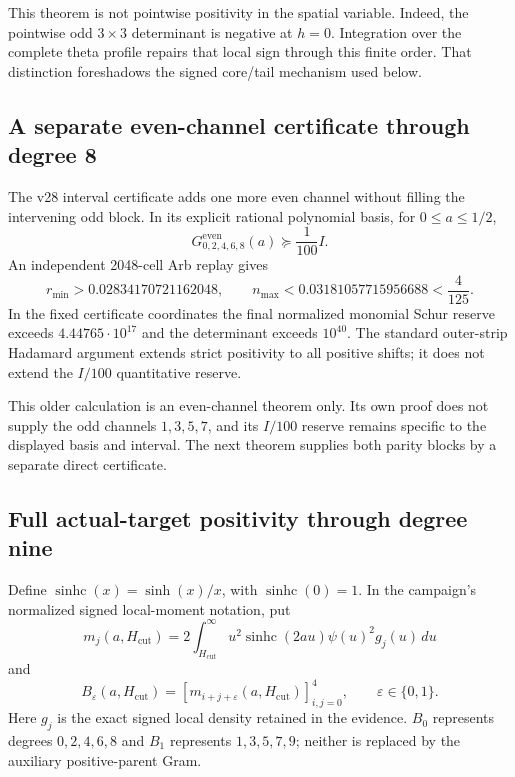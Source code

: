 \documentclass[11pt]{article}
\theoremstyle{definition}
\theoremstyle{remark}
\begin{document}
This theorem is not pointwise positivity in the spatial variable. Indeed, the
pointwise odd $3\times3$ determinant is negative at $h=0$. Integration over the
complete theta profile repairs that local sign through this finite order. That
distinction foreshadows the signed core/tail mechanism used below.

\subsection{A separate even-channel certificate through degree 8}

The v28 interval certificate adds one more even channel without filling the
intervening odd block. In its explicit rational polynomial basis, for
$0\le a\le1/2$,
\begin{equation}
 G^{\mathrm{even}}_{0,2,4,6,8}(a)\succeq\frac1{100}I.
 \label{eq:even8-reserve}
\end{equation}
An independent 2048-cell Arb replay gives
\begin{equation}
 r_{\min}>0.02834170721162048,
 \qquad n_{\max}<0.03181057715956688<\frac4{125}.
\end{equation}
In the fixed certificate coordinates the final normalized monomial Schur
reserve exceeds $4.44765\cdot10^{17}$ and the determinant exceeds $10^{40}$.
The standard outer-strip Hadamard argument
extends strict positivity to all positive shifts; it does not extend the
$I/100$ quantitative reserve.

This older calculation is an even-channel theorem only. Its own proof does not
supply the odd channels $1,3,5,7$, and its $I/100$ reserve remains specific to
the displayed basis and interval. The next theorem supplies both parity blocks
by a separate direct certificate.

\subsection{Full actual-target positivity through degree nine}

Define $\operatorname{sinhc}(x)=\sinh(x)/x$, with
$\operatorname{sinhc}(0)=1$. In the campaign's normalized signed local-moment
notation, put
\begin{equation}
 m_j(a,H_{\mathrm{cut}})
 =2\int_{H_{\mathrm{cut}}}^{\infty}
 u^2\operatorname{sinhc}(2au)\psi(u)^2g_j(u)\,du
 \label{eq:v32-shifted-moments}
\end{equation}
and
\begin{equation}
 B_\varepsilon(a,H_{\mathrm{cut}})
 =[m_{i+j+\varepsilon}(a,H_{\mathrm{cut}})]_{i,j=0}^{4},
 \qquad \varepsilon\in\{0,1\}.
 \label{eq:v32-parity-blocks}
\end{equation}
Here $g_j$ is the exact signed local density retained in the evidence.
$B_0$ represents degrees $0,2,4,6,8$ and $B_1$ represents
$1,3,5,7,9$; neither is replaced by the auxiliary positive-parent Gram.
\end{document}
